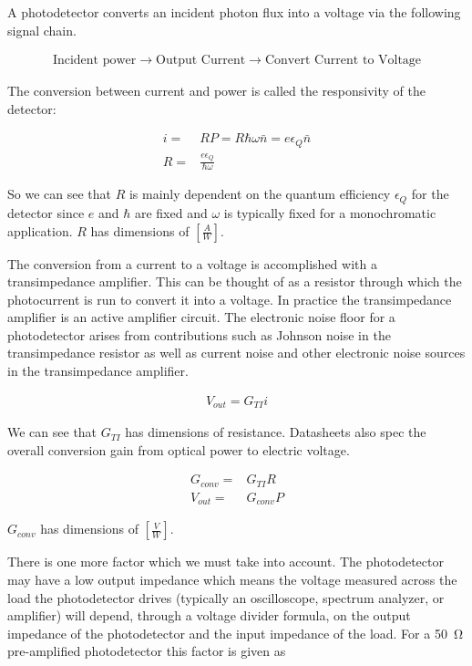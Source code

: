 \documentclass[12pt]{article}
\newcommand{\ep}{\epsilon}
\begin{document}
A photodetector converts an incident photon flux into a voltage via the following signal chain.

\begin{align}
\text{Incident power} \rightarrow \text{Output Current} \rightarrow \text{Convert Current to Voltage}
\end{align}

The conversion between current and power is called the responsivity of the detector:

\begin{align}
i =& R P = R \hbar \omega \bar{n} = e\ep_Q \bar{n}\\
R =& \frac{e \ep_Q}{\hbar \omega}
\end{align}

So we can see that $R$ is mainly dependent on the quantum efficiency $\ep_Q$ for the detector since $e$ and $\hbar$ are fixed and $\omega$ is typically fixed for a monochromatic application.
$R$ has dimensions of $\left[\frac{A}{W}\right]$.

The conversion from a current to a voltage is accomplished with a transimpedance amplifier.
This can be thought of as a resistor through which the photocurrent is run to convert it into a voltage.
In practice the transimpedance amplifier is an active amplifier circuit.
The electronic noise floor for a photodetector arises from contributions such as Johnson noise in the transimpedance resistor as well as current noise and other electronic noise sources in the transimpedance amplifier.

\begin{align}
V_{out} = G_{TI} i
\end{align}

We can see that $G_{TI}$ has dimensions of resistance.
Datasheets also spec the overall conversion gain from optical power to electric voltage.

\begin{align}
G_{conv} =& G_{TI}R\\
V_{out} =& G_{conv} P
\end{align}

$G_{conv}$ has dimensions of $\left[\frac{V}{W}\right]$.

There is one more factor which we must take into account.
The photodetector may have a low output impedance which means the voltage measured across the load the photodetector drives (typically an oscilloscope, spectrum analyzer, or amplifier) will depend, through a voltage divider formula, on the output impedance of the photodetector and the input impedance of the load.
For a \SI{50}{\ohm} pre-amplified photodetector this factor is given as
\end{document}
